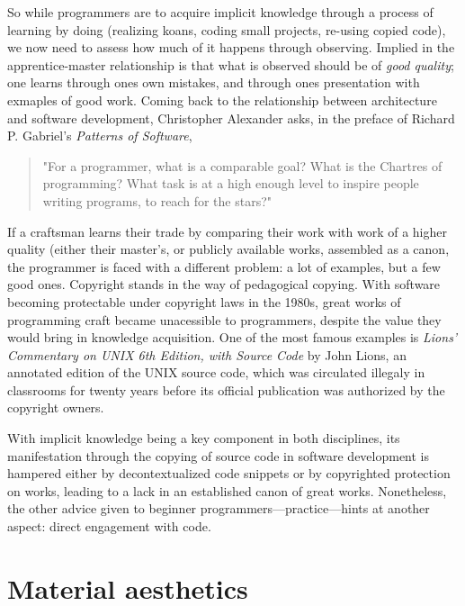 \documentclass{article}
\begin{document}
So while programmers are to acquire implicit knowledge through a process of learning by doing (realizing koans, coding small projects, re-using copied code), we now need to assess how much of it happens through observing. Implied in the apprentice-master relationship is that what is observed should be of \textit{good quality}; one learns through ones own mistakes, and through ones presentation with exmaples of good work. Coming back to the relationship between architecture and software development, Christopher Alexander asks, in the preface of Richard P. Gabriel's \textit{Patterns of Software}\cite{gabriel_patterns_1998},

\begin{quote}
    "For a programmer, what is a comparable goal? What is the Chartres of programming? What task is at a high enough level to inspire people writing programs, to reach for the stars?"    
\end{quote}

If a craftsman learns their trade by comparing their work with work of a higher quality (either their master's, or publicly available works, assembled as a canon\cite{taylor_patterns_2001}, the programmer is faced with a different problem: a lot of examples, but a few good ones.  Copyright stands in the way of pedagogical copying. With software becoming protectable under copyright laws in the 1980s\cite{oman_computer_2018}, great works of programming craft became unacessible to programmers, despite the value they would bring in knowledge acquisition\cite{gabriel_mob_2001}. One of the most famous examples is \emph{Lions' Commentary on UNIX 6th Edition, with Source Code} by John Lions, an annotated edition of the UNIX source code, which was circulated illegaly in classrooms for twenty years before its official publication was authorized by the copyright owners\cite{lions_lions_1996}.

With implicit knowledge being a key component in both disciplines, its manifestation through the copying of source code in software development is hampered either by decontextualized code snippets or by copyrighted protection on works, leading to a lack in an established canon of great works. Nonetheless, the other advice given to beginner programmers---practice---hints at another aspect: direct engagement with code.

\section{Material aesthetics}
\end{document}
